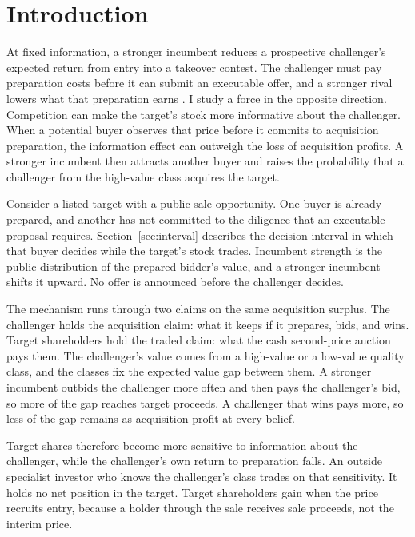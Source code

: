 \section{Introduction}\label{sec:intro}

At fixed information, a stronger incumbent reduces a prospective challenger's expected return from entry into a
takeover contest. The challenger must pay preparation costs before it can submit an executable offer, and a
stronger rival lowers what that preparation earns \citep{Fishman1988,HirshleiferPng1989}. I study a force in
the opposite direction. Competition can make the target's stock more informative about the challenger. When a
potential buyer observes that price before it commits to acquisition preparation, the information effect can
outweigh the loss of acquisition profits. A stronger incumbent then attracts another buyer and raises the
probability that a challenger from the high-value class acquires the target.

Consider a listed target with a public sale opportunity. One buyer is already prepared, and another has
not committed to the diligence that an executable proposal requires. Section~\ref{sec:interval} describes the
decision interval in which that buyer decides while the target's stock trades. Incumbent strength is the public
distribution of the prepared bidder's value, and a stronger incumbent shifts it upward. No offer is announced
before the challenger decides.

The mechanism runs through two claims on the same acquisition surplus. The challenger holds the acquisition
claim: what it keeps if it prepares, bids, and wins. Target shareholders hold the traded claim: what the cash
second-price auction pays them. The challenger's value comes from a high-value or a low-value quality class, and the
classes fix the expected value gap between them. A stronger incumbent outbids the challenger more often and then pays
the challenger's bid, so more of the gap reaches target proceeds. A challenger that wins pays more, so less of the gap
remains as acquisition profit at every belief.

Target shares therefore become more sensitive to information about the challenger, while the challenger's own return
to preparation falls. An outside specialist investor who knows the challenger's class trades on that sensitivity. It
holds no net position in the target. Target shareholders gain when the price recruits entry, because a holder through
the sale receives sale proceeds, not the interim price.

